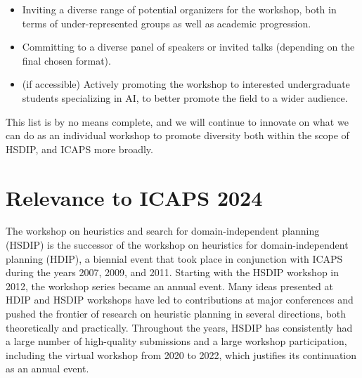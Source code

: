 \documentclass[10pt]{article}
\begin{document}
\begin{itemize}
  \item Inviting a diverse range of potential organizers for the workshop,
  both in terms of under-represented groups as well as academic progression.
  \item Committing to a diverse panel of speakers or invited talks (depending
  on the final chosen format).
  \item (if accessible) Actively promoting the workshop to interested undergraduate
  students specializing in AI, to better promote the field to a wider audience.
\end{itemize}

This list is by no means complete, and we will continue to innovate on what
we can do as an individual workshop to promote diversity both within the scope
of HSDIP, and ICAPS more broadly.






\section*{Relevance to ICAPS 2024}

The workshop on heuristics and search for domain-independent planning (HSDIP) is
the successor of the workshop on heuristics for domain-independent planning
(HDIP), a biennial event that took place in conjunction with ICAPS during the
years 2007, 2009, and 2011. Starting with the HSDIP workshop in 2012, the
workshop series became an annual event.
Many ideas presented at HDIP and HSDIP workshops have led to contributions at major
conferences and pushed the frontier of research on heuristic planning in several
directions, both theoretically and practically. Throughout the years, HSDIP has
consistently had a large number of high-quality submissions and a large workshop
participation, including the virtual workshop from 2020 to 2022, which justifies its
continuation as an annual event.
\end{document}
